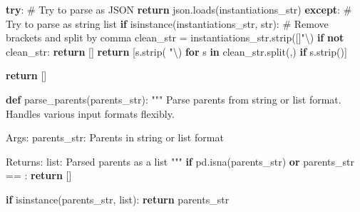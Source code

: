 \documentclass[
  11pt,
  letterpaper,
]{book}
\newenvironment{Shaded}{\begin{snugshade}}{\end{snugshade}}
\newcommand{\BuiltInTok}[1]{\textcolor[rgb]{0.00,0.23,0.31}{#1}}
\newcommand{\CharTok}[1]{\textcolor[rgb]{0.13,0.47,0.30}{#1}}
\newcommand{\CommentTok}[1]{\textcolor[rgb]{0.37,0.37,0.37}{#1}}
\newcommand{\ControlFlowTok}[1]{\textcolor[rgb]{0.00,0.23,0.31}{\textbf{#1}}}
\newcommand{\KeywordTok}[1]{\textcolor[rgb]{0.00,0.23,0.31}{\textbf{#1}}}
\newcommand{\NormalTok}[1]{\textcolor[rgb]{0.00,0.23,0.31}{#1}}
\newcommand{\OperatorTok}[1]{\textcolor[rgb]{0.37,0.37,0.37}{#1}}
\newcommand{\StringTok}[1]{\textcolor[rgb]{0.13,0.47,0.30}{#1}}
\begin{document}
\begin{Shaded}
\begin{Highlighting}[]
    \ControlFlowTok{try}\NormalTok{:}
        \CommentTok{\# Try to parse as JSON}
        \ControlFlowTok{return}\NormalTok{ json.loads(instantiations\_str)}
    \ControlFlowTok{except}\NormalTok{:}
        \CommentTok{\# Try to parse as string list}
        \ControlFlowTok{if} \BuiltInTok{isinstance}\NormalTok{(instantiations\_str, }\BuiltInTok{str}\NormalTok{):}
            \CommentTok{\# Remove brackets and split by comma}
\NormalTok{            clean\_str }\OperatorTok{=}\NormalTok{ instantiations\_str.strip(}\StringTok{\textquotesingle{}[]"}\CharTok{\textbackslash{}\textquotesingle{}}\StringTok{\textquotesingle{}}\NormalTok{)}
            \ControlFlowTok{if} \KeywordTok{not}\NormalTok{ clean\_str:}
                \ControlFlowTok{return}\NormalTok{ []}
            \ControlFlowTok{return}\NormalTok{ [s.strip(}\StringTok{\textquotesingle{} "}\CharTok{\textbackslash{}\textquotesingle{}}\StringTok{\textquotesingle{}}\NormalTok{) }\ControlFlowTok{for}\NormalTok{ s }\KeywordTok{in}\NormalTok{ clean\_str.split(}\StringTok{\textquotesingle{},\textquotesingle{}}\NormalTok{) }\ControlFlowTok{if}\NormalTok{ s.strip()]}

    \ControlFlowTok{return}\NormalTok{ []}

\KeywordTok{def}\NormalTok{ parse\_parents(parents\_str):}
    \CommentTok{"""}
\CommentTok{    Parse parents from string or list format.}
\CommentTok{    Handles various input formats flexibly.}

\CommentTok{    Args:}
\CommentTok{        parents\_str: Parents in string or list format}

\CommentTok{    Returns:}
\CommentTok{        list: Parsed parents as a list}
\CommentTok{    """}
    \ControlFlowTok{if}\NormalTok{ pd.isna(parents\_str) }\KeywordTok{or}\NormalTok{ parents\_str }\OperatorTok{==} \StringTok{\textquotesingle{}\textquotesingle{}}\NormalTok{:}
        \ControlFlowTok{return}\NormalTok{ []}

    \ControlFlowTok{if} \BuiltInTok{isinstance}\NormalTok{(parents\_str, }\BuiltInTok{list}\NormalTok{):}
        \ControlFlowTok{return}\NormalTok{ parents\_str}


\end{Highlighting}
\end{Shaded}
\end{document}
